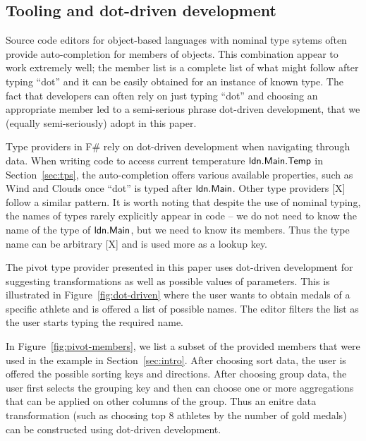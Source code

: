 \documentclass[a4paper,UKenglish]{lipics-v2016}
\theoremstyle{plain}
\theoremstyle{definition}
\newcommand{\ident}[1]{\textnormal{\sffamily #1}}
\newcommand{\qident}[1]{\textnormal{\sffamily \guillemotleft #1\guillemotright}}
\begin{document}
  
\subsection{Tooling and dot-driven development}
\label{sec:analysis-auto}

Source code editors for object-based languages with nominal type sytems often provide 
auto-completion for members of objects. This combination appear to work extremely well; the
member list is a complete list of what might follow after typing ``dot'' and it can be easily
obtained for an instance of known type. The fact that developers can often rely on just typing
``dot'' and choosing an appropriate member led to a semi-serious phrase dot-driven development,
that we (equally semi-seriously) adopt in this paper.

Type providers in F\# rely on dot-driven development when navigating through data. When writing code 
to access current temperature $\ident{ldn.Main.Temp}$ in Section~\ref{sec:tps}, the auto-completion
offers various available properties, such as \ident{Wind} and \ident{Clouds} once ``dot'' is typed
after $\ident{ldn.Main}$. Other type providers [X] follow a similar pattern. It is worth noting
that despite the use of nominal typing, the names of types rarely explicitly appear in code -- we
do not need to know the name of the type of $\ident{ldn.Main}$, but we need to know its members.
Thus the type name can be arbitrary [X] and is used more as a lookup key.

The pivot type provider presented in this paper uses dot-driven development for suggesting 
transformations as well as possible values of parameters. This is illustrated in Figure~\ref{fig:dot-driven}
where the user wants to obtain medals of a specific athlete and is offered a list of possible 
names. The editor filters the list as the user starts typing the required name. 

In Figure~\ref{fig:pivot-members}, we list a subset of the provided members that were used in the
example in Section~\ref{sec:intro}. After choosing \qident{sort data}, the user is offered 
the possible sorting keys and directions. After choosing \qident{group data}, the user first 
selects the grouping key and then can choose one or more aggregations that can be applied on
other columns of the group. Thus an enitre data transformation (such as choosing top 8 athletes
by the number of gold medals) can be constructed using dot-driven development.
  
\end{document}
